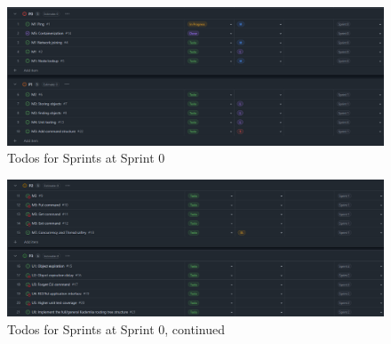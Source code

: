 \begin{figure}[h!]
    \centering
    \includegraphics[width=1\textwidth]{Images/todos_for_sprints_at_sprint_0.png}
    \caption{Todos for Sprints at Sprint 0}
    \label{fig:todos_for_sprints_at_sprint_0}
\end{figure}

\begin{figure}[h!]
    \centering
    \includegraphics[width=1\textwidth]{Images/todos_for_sprints_at_sprint_0_1.png}
    \caption{Todos for Sprints at Sprint 0, continued}
    \label{fig:todos_for_sprints_at_sprint_0_1}
\end{figure}